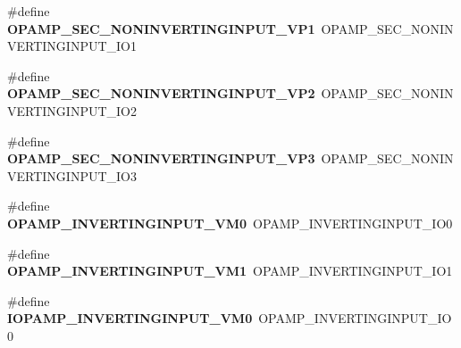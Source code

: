 \begin{DoxyCompactItemize}
\item 
\hypertarget{group___h_a_l___o_p_a_m_p___aliased___defines_ga044a5996a702fe67bd404674d6ce2890}{\#define {\bfseries O\-P\-A\-M\-P\-\_\-\-S\-E\-C\-\_\-\-N\-O\-N\-I\-N\-V\-E\-R\-T\-I\-N\-G\-I\-N\-P\-U\-T\-\_\-\-V\-P1}~O\-P\-A\-M\-P\-\_\-\-S\-E\-C\-\_\-\-N\-O\-N\-I\-N\-V\-E\-R\-T\-I\-N\-G\-I\-N\-P\-U\-T\-\_\-\-I\-O1}\label{group___h_a_l___o_p_a_m_p___aliased___defines_ga044a5996a702fe67bd404674d6ce2890}

\item 
\hypertarget{group___h_a_l___o_p_a_m_p___aliased___defines_ga99d279a0ad7e685d456f454d4eb90c02}{\#define {\bfseries O\-P\-A\-M\-P\-\_\-\-S\-E\-C\-\_\-\-N\-O\-N\-I\-N\-V\-E\-R\-T\-I\-N\-G\-I\-N\-P\-U\-T\-\_\-\-V\-P2}~O\-P\-A\-M\-P\-\_\-\-S\-E\-C\-\_\-\-N\-O\-N\-I\-N\-V\-E\-R\-T\-I\-N\-G\-I\-N\-P\-U\-T\-\_\-\-I\-O2}\label{group___h_a_l___o_p_a_m_p___aliased___defines_ga99d279a0ad7e685d456f454d4eb90c02}

\item 
\hypertarget{group___h_a_l___o_p_a_m_p___aliased___defines_gac8152b9a1e42f8513a907918f2db651b}{\#define {\bfseries O\-P\-A\-M\-P\-\_\-\-S\-E\-C\-\_\-\-N\-O\-N\-I\-N\-V\-E\-R\-T\-I\-N\-G\-I\-N\-P\-U\-T\-\_\-\-V\-P3}~O\-P\-A\-M\-P\-\_\-\-S\-E\-C\-\_\-\-N\-O\-N\-I\-N\-V\-E\-R\-T\-I\-N\-G\-I\-N\-P\-U\-T\-\_\-\-I\-O3}\label{group___h_a_l___o_p_a_m_p___aliased___defines_gac8152b9a1e42f8513a907918f2db651b}

\item 
\hypertarget{group___h_a_l___o_p_a_m_p___aliased___defines_gaa6ab36e92c4c9e5f08a766d722cc12e2}{\#define {\bfseries O\-P\-A\-M\-P\-\_\-\-I\-N\-V\-E\-R\-T\-I\-N\-G\-I\-N\-P\-U\-T\-\_\-\-V\-M0}~O\-P\-A\-M\-P\-\_\-\-I\-N\-V\-E\-R\-T\-I\-N\-G\-I\-N\-P\-U\-T\-\_\-\-I\-O0}\label{group___h_a_l___o_p_a_m_p___aliased___defines_gaa6ab36e92c4c9e5f08a766d722cc12e2}

\item 
\hypertarget{group___h_a_l___o_p_a_m_p___aliased___defines_ga1d73eb5e8d6e1c4e22cbdd896586375a}{\#define {\bfseries O\-P\-A\-M\-P\-\_\-\-I\-N\-V\-E\-R\-T\-I\-N\-G\-I\-N\-P\-U\-T\-\_\-\-V\-M1}~O\-P\-A\-M\-P\-\_\-\-I\-N\-V\-E\-R\-T\-I\-N\-G\-I\-N\-P\-U\-T\-\_\-\-I\-O1}\label{group___h_a_l___o_p_a_m_p___aliased___defines_ga1d73eb5e8d6e1c4e22cbdd896586375a}

\item 
\hypertarget{group___h_a_l___o_p_a_m_p___aliased___defines_ga16004eef1f4113ba471e24cd51570a78}{\#define {\bfseries I\-O\-P\-A\-M\-P\-\_\-\-I\-N\-V\-E\-R\-T\-I\-N\-G\-I\-N\-P\-U\-T\-\_\-\-V\-M0}~O\-P\-A\-M\-P\-\_\-\-I\-N\-V\-E\-R\-T\-I\-N\-G\-I\-N\-P\-U\-T\-\_\-\-I\-O0}\label{group___h_a_l___o_p_a_m_p___aliased___defines_ga16004eef1f4113ba471e24cd51570a78}


\end{DoxyCompactItemize}
